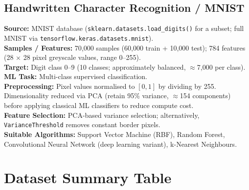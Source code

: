 \documentclass[12pt,a4paper]{article}
\begin{document}
\subsection{Handwritten Character Recognition / MNIST}

\textbf{Source:} MNIST database (\texttt{sklearn.datasets.load\_digits()} for a subset;
full MNIST via \texttt{tensorflow.keras.datasets.mnist}).\\
\textbf{Samples / Features:} 70,000 samples (60,000 train + 10,000 test);
784 features (28 $\times$ 28 pixel greyscale values, range 0--255).\\
\textbf{Target:} Digit class 0--9 (10 classes; approximately balanced, $\approx$7,000 per class).\\
\textbf{ML Task:} Multi-class supervised classification.\\
\textbf{Preprocessing:} Pixel values normalised to $[0, 1]$ by dividing by 255.
Dimensionality reduced via PCA (retain 95\% variance, $\approx$154 components)
before applying classical ML classifiers to reduce compute cost.\\
\textbf{Feature Selection:} PCA-based variance selection; alternatively,
\texttt{VarianceThreshold} removes constant border pixels.\\
\textbf{Suitable Algorithms:} Support Vector Machine (RBF), Random Forest,
Convolutional Neural Network (deep learning variant), k-Nearest Neighbours.

\section{Dataset Summary Table}
\end{document}
